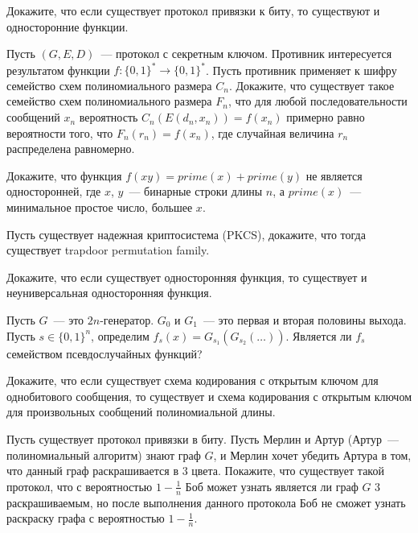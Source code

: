 \setcounter{curtask}{33}


\begin{task}
    Докажите, что если существует протокол привязки к биту, то существуют и
    односторонние функции.
\end{task}

\begin{task}
    Пусть $(G, E, D)$~--- протокол с секретным ключом. Противник интересуется
    результатом функции $f: \{0, 1\}^* \to \{0, 1\}^*$. Пусть противник применяет к
    шифру семейство схем полиномиального размера $C_n$. Докажите, что существует
    такое семейство схем полиномиального размера $F_n$, что для любой
    последовательности сообщений $x_n$ вероятность $C_n(E(d_n, x_n)) = f(x_n)$
    примерно равно вероятности того, что $F_n(r_n) = f(x_n)$, где случайная величина
    $r_n$ распределена равномерно.
\end{task}

\breakline

\begin{ptask}{12}
    Докажите, что функция $f(xy) = prime(x) + prime(y)$ не является односторонней,
    где $x$, $y$~--- бинарные строки длины $n$, а $prime(x)$~--- минимальное простое
    число, большее $x$.
\end{ptask}

\begin{ptask}{27}
    Пусть существует надежная криптосистема (PKCS), докажите, что тогда существует
    trapdoor permutation family.
\end{ptask}

\begin{ptask}{28}
    Докажите, что если существует односторонняя функция, то существует и
    неуниверсальная односторонняя функция.
\end{ptask}

\begin{ptask}{31}
    Пусть $G$~--- это $2n$-генератор. $G_0$ и $G_1$~--- это первая и вторая половины
    выхода. Пусть $s \in \{0, 1\}^n$, определим $f_s(x) =
    G_{s_1}(G_{s_2}(\dots))$. Является ли $f_s$ семейством псевдослучайных функций?
\end{ptask}

\begin{ptask}{32}
    Докажите, что если существует схема кодирования с открытым ключом для
    однобитового сообщения, то существует и схема кодирования с открытым ключом для
    произвольных сообщений полиномиальной длины.
\end{ptask}

\begin{ptask}{33}
    Пусть существует протокол привязки в биту. Пусть Мерлин и Артур (Артур~---
    полиномиальный алгоритм) знают граф $G$, и Мерлин хочет убедить Артура в том, что
    данный граф раскрашивается в $3$ цвета. Покажите, что существует такой протокол,
    что с вероятностью $1 - \frac{1}{n}$ Боб может узнать является ли граф $G$ $3$
    раскрашиваемым, но после выполнения данного протокола Боб не сможет узнать
    раскраску графа с вероятностью $1 - \frac{1}{n}$.
\end{ptask}